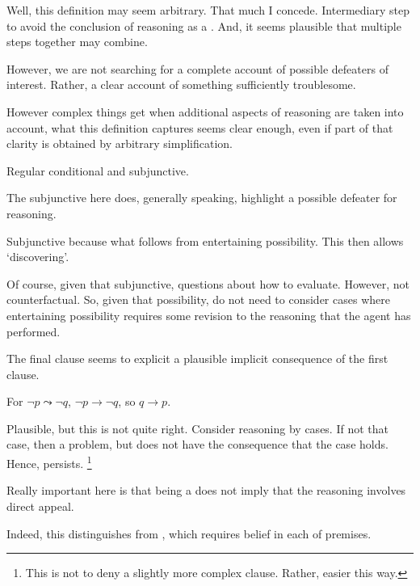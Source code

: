 \begin{note}
  Well, this definition may seem arbitrary.
  That much I concede.
  Intermediary step to avoid the conclusion of reasoning as a \requ{}.
  And, it seems plausible that multiple steps together may combine.

  However, we are not searching for a complete account of possible defeaters of interest.
  Rather, a clear account of something sufficiently troublesome.

  However complex things get when additional aspects of reasoning are taken into account, what this definition captures seems clear enough, even if part of that clarity is obtained by arbitrary simplification.
\end{note}

\begin{note}
  Regular conditional and subjunctive.
\end{note}

\begin{note}
  The subjunctive here does, generally speaking, highlight a possible defeater for reasoning.

  Subjunctive because what follows from entertaining possibility.
  This then allows `discovering'.

  Of course, given that subjunctive, questions about how to evaluate.
  However, not counterfactual.
  So, given that possibility, do not need to consider cases where entertaining possibility requires some revision to the reasoning that the agent has performed.

  The final clause seems to explicit a plausible implicit consequence of the first clause.

  For \(\lnot p \leadsto \lnot q\), \(\lnot p \rightarrow \lnot q\), so \(q \rightarrow p\).

  Plausible, but this is not quite right.
  Consider reasoning by cases.
  If not that case, then a problem, but does not have the consequence that the case holds.
  Hence, persists.\nolinebreak
  \footnote{
    This is not to deny a slightly more complex clause.
    Rather, easier this way.
  }
\end{note}



\begin{note}
  Really important here is that being a \requ{} does not imply that the reasoning involves direct appeal.

  {
    \color{red}
    Indeed, this distinguishes from \citeauthor{Sgaravatti:2013wu}, which requires belief in each of premises.
  }
\end{note}

